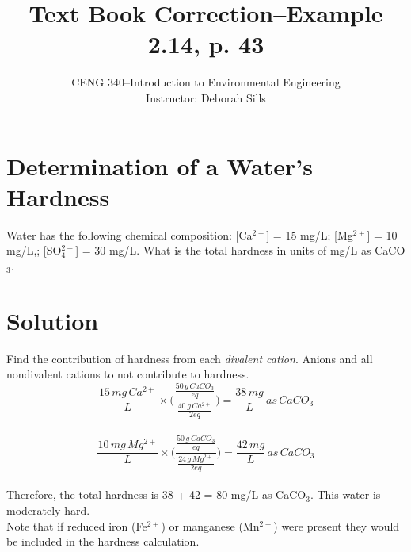 \documentclass[12pt,letterpaper]{article}
\begin{document}
\setlength{\parindent}{0cm} 


\frenchspacing

\title {Text Book Correction--Example 2.14, p. 43} 
\author {CENG 340--Introduction to Environmental Engineering\\
Instructor: Deborah Sills}
\maketitle

\section *{Determination of a Water's Hardness}
Water has the following chemical composition: [Ca$^{2+}$] = 15 mg/L; [Mg$^{2+}$] = 10 mg/L,; [SO$_4^{2-}$] = 30 mg/L.  What is the total hardness in units of mg/L as CaCO$_3$.

\section *{Solution}
Find the contribution of hardness from each \emph{divalent cation}.  Anions and all nondivalent cations to not contribute to hardness.\\

\begin{equation}
\frac{15\, mg\, Ca^{2+}}{{L}}\times\Bigg(\frac{\frac{50 \, g \, CaCO_3}{eq}}{\frac{40 \, g \, Ca^{2+}}{2 eq}}\Bigg) = \frac{38 \, mg}{L}\, as \, CaCO_3
\end{equation}\\

\begin{equation}
\frac{10\, mg\, Mg^{2+}}{{L}}\times\Bigg(\frac{\frac{50 \, g \, CaCO_3}{eq}}{\frac{24 \, g \, Mg^{2+}}{2 eq}}\Bigg) = \frac{42 \, mg}{L}\, as \, CaCO_3
\end{equation}\\

Therefore, the total hardness is 38 + 42 = 80 mg/L as CaCO$_3$.  This water is moderately hard.  \\

Note that if reduced iron (Fe$^{2+}$) or manganese (Mn$^{2+}$) were present they would be included in the hardness calculation.
\end{document}
